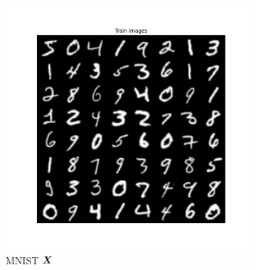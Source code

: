 \documentclass[../../book-main.tex]{subfiles}
\begin{document}

\begin{figure}[t]
    \begin{subfigure}[t]{0.3\textwidth}
        \centering
        \includegraphics[width=\textwidth]{figs_chap6/MNIST_MNIST_train_images_epoch200.png}
        \caption{{\small MNIST $\bm{X}$}}
    \end{subfigure}
    \hfill
    \begin{subfigure}[t]{0.3\textwidth}
        \centering

\end{subfigure}
\end{figure}
\end{document}
